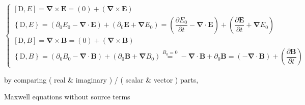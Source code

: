\documentclass[
]{book}
\theoremstyle{definition}
\theoremstyle{definition}
\theoremstyle{definition}
\theoremstyle{definition}
\theoremstyle{remark}
\begin{document}
\[
\begin{cases}
\left[\mathrm{D},E\right]=\boldsymbol{\nabla}\times\boldsymbol{E}=\left(0\right)+\left(\boldsymbol{\nabla}\times\boldsymbol{E}\right)\\
\left\{ \mathrm{D},E\right\} =\left(\partial_{{\scriptscriptstyle 0}}E_{{\scriptscriptstyle 0}}-\boldsymbol{\nabla}\cdot\boldsymbol{E}\right)+\left(\partial_{{\scriptscriptstyle 0}}\boldsymbol{E}+\boldsymbol{\nabla}E_{{\scriptscriptstyle 0}}\right)=\left(\dfrac{\partial E_{{\scriptscriptstyle 0}}}{\partial t}-\boldsymbol{\nabla}\cdot\boldsymbol{E}\right)+\left(\dfrac{\partial\boldsymbol{E}}{\partial t}+\boldsymbol{\nabla}E_{{\scriptscriptstyle 0}}\right)\\
\left[\mathrm{D},B\right]=\boldsymbol{\nabla}\times\boldsymbol{B}=\left(0\right)+\left(\boldsymbol{\nabla}\times\boldsymbol{B}\right)\\
\left\{ \mathrm{D},B\right\} =\left(\partial_{{\scriptscriptstyle 0}}B_{{\scriptscriptstyle 0}}-\boldsymbol{\nabla}\cdot\boldsymbol{B}\right)+\left(\partial_{{\scriptscriptstyle 0}}\boldsymbol{B}+\boldsymbol{\nabla}B_{{\scriptscriptstyle 0}}\right)\overset{B_{{\scriptscriptstyle 0}}=0}{=}-\boldsymbol{\nabla}\cdot\boldsymbol{B}+\partial_{{\scriptscriptstyle 0}}\boldsymbol{B}=\left(-\boldsymbol{\nabla}\cdot\boldsymbol{B}\right)+\left(\dfrac{\partial\boldsymbol{B}}{\partial t}\right)
\end{cases}
\]

by comparing ( real \& imaginary ) / ( scalar \& vector ) parts,

Maxwell equations without source terms
\end{document}

